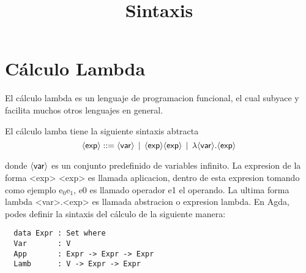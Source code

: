 \chapter{Cálculo Lambda}
\label{chap:lambda}

El cálculo lambda es un lenguaje de programacion funcional, el cual subyace y facilita muchos otros lenguajes en general.

\title{Sintaxis}
\maketitle

El cálculo lamba tiene la siguiente sintaxis abtracta \\

\[
\langle \mathsf{exp} \rangle ::= \langle \mathsf{var} \rangle\,\mid\, \langle \mathsf{exp} \rangle \langle \mathsf{exp} \rangle \,\mid\, \lambda \langle \mathsf{var} \rangle.\langle \mathsf{exp} \rangle
\]

donde \( \langle \mathsf{var} \rangle \) es un conjunto predefinido de variables infinito. La expresion de la forma <exp> <exp> es llamada aplicacion, dentro de esta expresion tomando como ejemplo e$_{0}$e$_{1}$, e0 es llamado operador e1 el operando. La ultima forma lambda <var>.<exp> es llamada abstracion o expresion lambda.
En Agda, podes definir la sintaxis del cálculo de la siguiente manera: \\

\begin{lstlisting}
  data Expr : Set where
  Var       : V
  App       : Expr -> Expr -> Expr
  Lamb      : V -> Expr -> Expr
\end{lstlisting}







